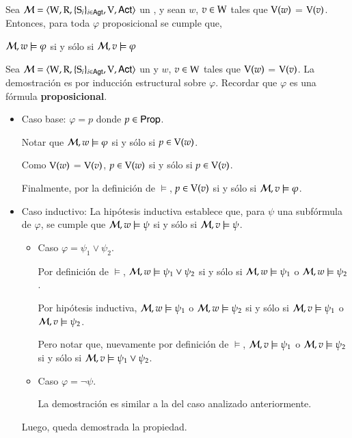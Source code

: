 \begin{lema}\label{lema:propositional-equivalence}
    Sea $\mathcal{M}=\langle \mathrm{W},\mathrm{R},\{ \mathrm{S}_i \}_{i \in {\rm \sf Agt}},\mathrm{V},{\rm \sf Act} \rangle$ un \ults, y sean $w$, $v \in \mathrm{W}$
    tales que $\mathrm{V}(w)$ = $\mathrm{V}(v)$. Entonces, para toda $\varphi$ proposicional se cumple que, 
    \begin{center}
    $\mathcal{M}, w \models \varphi$ \quad si y sólo si \quad $ 
    \mathcal{M}, v \models \varphi$
    \end{center}
\end{lema}

\begin{demostracion}
    Sea $\mathcal{M}=\langle \mathrm{W},\mathrm{R},\{ \mathrm{S}_i \}_{i \in {\rm \sf Agt}},\mathrm{V},{\rm \sf Act} \rangle$ un \ults y $w$, $v \in \mathrm{W}$
    tales que $\mathrm{V}(w)$ = $\mathrm{V}(v)$. La demostración es por inducción estructural sobre $\varphi$. 
    Recordar que $\varphi$ es una fórmula \textbf{proposicional}.

    \begin{itemize}
        \item Caso base: $\varphi = p$ donde $p \in {\rm \sf Prop}$.

        Notar que  $\mathcal{M}, w \models \varphi$ si y sólo si $p \in \mathrm{V}(w)$.

        Como $\mathrm{V}(w)$ = $\mathrm{V}(v)$, $p \in \mathrm{V}(w)$ si y sólo si $p \in \mathrm{V}(v)$.

        Finalmente, por la definición de $\models$, $p \in \mathrm{V}(v)$ si y sólo si $\mathcal{M}, v \models \varphi$.  
    
        \item Caso inductivo: La hipótesis inductiva establece que, para $\psi$ una subfórmula de $\varphi$, 
        se cumple que $\mathcal{M}, w \models \psi$ si y sólo si $\mathcal{M}, v \models \psi$.

        \begin{itemize}
            \item Caso $\varphi = \psi_1 \lor \psi_2$. 
    
            Por definición de $\models$, $\mathcal{M}, w \models \psi_1 \lor \psi_2$ si y sólo si $\mathcal{M},
            w \models \psi_1$ o $\mathcal{M}, w \models \psi_2$.
            
            Por hipótesis inductiva, $\mathcal{M}, w \models \psi_1$ o $\mathcal{M}, w \models \psi_2 $ si y sólo
            si $\mathcal{M}, v \models \psi_1$ o $\mathcal{M}, v \models \psi_2$. 
            
            Pero notar que, nuevamente por definición de $\models$, $\mathcal{M}, v \models \psi_1$ o $\mathcal{M},
            v \models \psi_2$ si y sólo si $\mathcal{M},v \models \psi_1 \lor \psi_2$.  

            \item Caso $\varphi = \neg \psi$.
        
            La demostración es similar a la del caso analizado anteriormente.
        \end{itemize}
        Luego, queda demostrada la propiedad.
    \end{itemize}
    
\end{demostracion}

